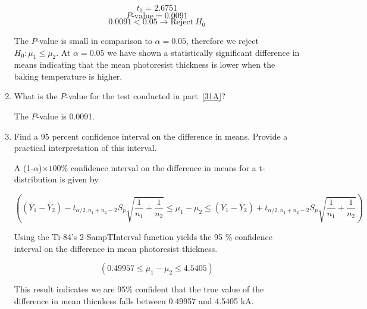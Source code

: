 \documentclass[../main.tex]{subfiles}
\begin{document}
\begin{enumerate}[label = (\alph*)]
        \[t_0 = 2.6751\]
        \[P\textrm{-value} = 0.0091\]
        \[0.0091 < 0.05 \rightarrow \textrm{Reject} \ H_0\]

        The $P$-value is small in comparison to \(\alpha = 0.05\), therefore we reject \(H_0 : \mu_1 \le \mu_2\).
        At \(\alpha = 0.05\) we have shown a statistically significant difference in means indicating that the mean photoresist thickness is lower when the baking temperature is higher.
        
    \item
        What is the $P$-value for the test conducted in part~\ref{31A}?

        \solution{}

        The $P$-value is 0.0091.

    \item
        Find a 95 percent confidence interval on the difference in means.
        Provide a practical interpretation of this interval.

        \solution{}

        A (1-$\alpha$)$\times100$\% confidence interval on the difference in means for a t-distribution is given by 

        \[ 
            \left({
                (\bar{Y}_1-\bar{Y}_2) - t_{\alpha/2,n_1+n_2-2} S_p \sqrt{\frac{1}{n_1} + \frac{1}{n_2}} \le \mu_1-\mu_2 \le (\bar{Y}_1-\bar{Y}_2) + t_{\alpha/2,n_1+n_2-2} S_p \sqrt{\frac{1}{n_1} + \frac{1}{n_2}}
            }\right)  
        \]

        Using the Ti-84's 2-SampTInterval function yields the 95 \% confidence interval on the difference in mean photoresist thickness.

        \[
            \boxed{\left(0.49957  \le \mu_1-\mu_2 \le 4.5405 \right)}
        \]

        This result indicates we are 95\% confident that the true value of the difference in mean thicnkess falls between 0.49957 and 4.5405 kA.
        

\end{enumerate}
\end{document}

